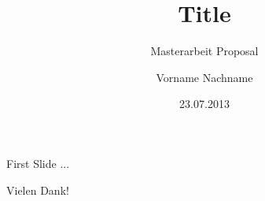 \documentclass{beamer}
\title[Title]{Title}
\subtitle[Masterarbeit Proposal]{Masterarbeit Proposal}
\author[Vorname Nachname]{Vorname Nachname}
\date[23.07.2013]{23.07.2013}
\institute[Institut~f\"ur~Organisation und Management von Informationssystemen]{Institut~f\"ur~Organisation und Management von Informationssystemen}
\begin{document}
\frame[plain]{\titlepage}

\begin{frame}[fragile]{First Slide}
...
\end{frame}

\begin{frame}[fragile]{}
    \center
    Vielen Dank!
    \vfill
\end{frame}
\end{document}
